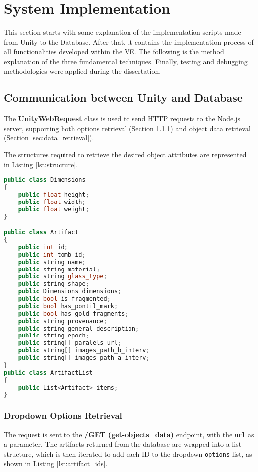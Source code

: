 \section{System Implementation}
\label{sec:implementation}

This section starts with some explanation of the implementation scripts made from Unity to the Database.
After that, it contains the implementation process of all functionalities developed within the \gls{VE}.
The following is the method explanation of the three fundamental techniques.
Finally, testing and debugging methodologies were applied during the dissertation.

\subsection{Communication between Unity and Database}

The \textbf{UnityWebRequest} class is used to send HTTP requests to the Node.js server, supporting both options retrieval (Section \ref{sec:options}) and object data retrieval (Section \ref{sec:data_retrieval}).

The structures required to retrieve the desired object attributes are represented in Listing \ref{lst:structure}.

\begin{lstlisting}[language=C++, caption={Artifact Structure to extract responses.}, label={lst:structure}]
public class Dimensions
{
    public float height;
    public float width;
    public float weight;
}

public class Artifact
{
    public int id;
    public int tomb_id;
    public string name;
    public string material;
    public string glass_type;
    public string shape;
    public Dimensions dimensions;
    public bool is_fragmented;
    public bool has_pontil_mark;
    public bool has_gold_fragments;
    public string provenance;
    public string general_description;
    public string epoch;
    public string[] paralels_url;
    public string[] images_path_b_interv;
    public string[] images_path_a_interv;
}
public class ArtifactList
{
    public List<Artifact> items;
}
\end{lstlisting}

\subsubsection{Dropdown Options Retrieval}
\label{sec:options}
The request is sent to the \textbf{/GET (get-objects\_data)} endpoint, with the \texttt{url} as a parameter.
The artifacts returned from the database are wrapped into a list structure, which is then iterated to add each ID to the dropdown \texttt{options} list, as shown in Listing \ref{lst:artifact_ids}.

